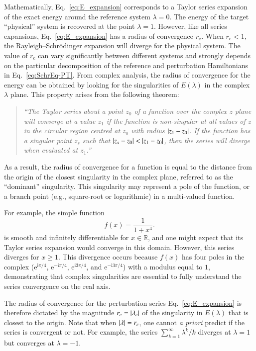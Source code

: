 \documentclass[aps,prb,reprint,noshowkeys,superscriptaddress]{revtex4-1}
\newcommand{\latin}[1]{#1}
\newcommand{\eg}{\latin{e.g.}}
\renewcommand{\i}{\mathrm{i}} %
\newcommand{\e}{\mathrm{e}} %
\newcommand{\rc}{r_{\text{c}}}
\begin{document}
Mathematically, Eq.~\eqref{eq:E_expansion} corresponds to a Taylor series expansion of the exact energy
around the reference system $\lambda = 0$.
The energy of the target ``physical'' system is recovered at the point $\lambda = 1$.
However, like all series expansions, Eq.~\eqref{eq:E_expansion} has a radius of convergence $\rc$. 
When $\rc < 1$, the Rayleigh--Schr\"{o}dinger expansion will diverge
for the physical system.
The value of $\rc$ can vary significantly between different systems and strongly depends on the particular decomposition
of the reference and perturbation Hamiltonians in Eq.~\eqref{eq:SchrEq-PT}.\cite{Mihalka_2017b}
%
From complex analysis, \cite{BenderBook} the radius of convergence for the energy can be obtained by looking for the 
singularities of $E(\lambda)$ in the complex $\lambda$ plane.
This property arises from the following theorem: \cite{Goodson_2011}
\begin{quote}
\it
``The Taylor series about a point $z_0$ of a function over the complex $z$ plane will converge at a value $z_1$ 
if the function is non-singular at all values of $z$ in the circular region centred at $z_0$ with radius $\abs{z_1-z_0}$. 
If the function has a singular point $z_s$ such that $\abs{z_s-z_0} < \abs{z_1-z_0}$, 
then the series will diverge when evaluated at $z_1$.''
\end{quote}
As a result, the radius of convergence for a function is equal to the distance from the origin of the closest singularity
in the complex plane, referred to as the ``dominant'' singularity.
This singularity may represent a pole of the function, or a branch point (\eg, square-root or logarithmic)
in a multi-valued function.

For example, the simple function
\begin{equation} \label{eq:DivExample}
	f(x)=\frac{1}{1+x^4}.
\end{equation}
is smooth and infinitely differentiable for $x \in \mathbb{R}$, and one might expect that its Taylor series expansion would 
converge in this domain.
However, this series diverges for $x \ge 1$.
This divergence occurs because $f(x)$ has four poles in the complex 
($\e^{\i\pi/4}$, $\e^{-\i\pi/4}$, $\e^{\i3\pi/4}$, and $\e^{-\i3\pi/4}$) with a modulus equal to $1$, demonstrating
that complex singularities are essential to fully understand the series convergence on the real axis.\cite{BenderBook}

The radius of convergence for the perturbation series Eq.~\eqref{eq:E_expansion} is therefore dictated by the magnitude $r_c = \abs{\lambda_c}$ of the
singularity in $E(\lambda)$ that is closest to the origin.
Note that when $\abs{\lambda} = r_c$, one cannot \textit{a priori} predict if the series is convergent or not.
For example, the series $\sum_{k=1}^\infty \lambda^k/k$ diverges at $\lambda = 1$ but converges at $\lambda = -1$.
\end{document}
